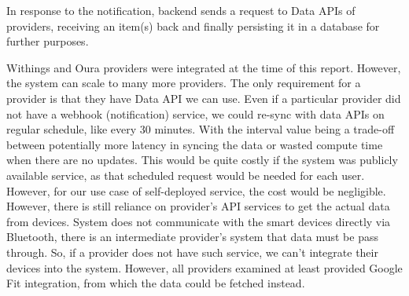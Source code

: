 In response to the notification, backend sends a request to Data APIs of providers, receiving an item(s) back and finally persisting it in a database for further purposes. 

Withings and Oura providers were integrated at the time of this report. However, the system can scale to many more providers. The only requirement for a provider is that they have Data API we can use. Even if a particular provider did not have a webhook (notification) service, we could re-sync with data APIs on regular schedule, like every 30 minutes. With the interval value being a trade-off between potentially more latency in syncing the data or wasted compute time when there are no updates. This would be quite costly if the system was publicly available service, as that scheduled request would be needed for each user. However, for our use case of self-deployed service, the cost would be negligible. However, there is still reliance on provider's API services to get the actual data from devices. System does not communicate with the smart devices directly via Bluetooth, there is an intermediate provider's system that data must be pass through. So, if a provider does not have such service, we can't integrate their devices into the system. However, all providers examined at least provided Google Fit integration, from which the data could be fetched instead. 

